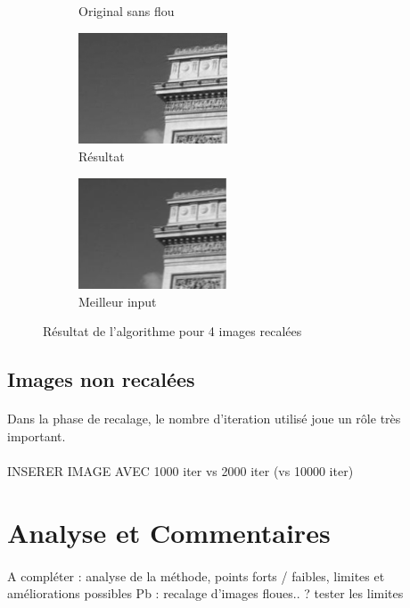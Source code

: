 \documentclass[a4paper,10pt]{report}
\begin{document}
\begin{figure}[h]
\begin{subfigure}{0.32\textwidth}
\caption{Original sans flou}
\label{fig:Original}
\end{subfigure}
\begin{subfigure}{0.32\textwidth}
\includegraphics[width=0.9\linewidth, height=3.3cm]{ressource/detail_result.png}
\caption{Résultat}
\label{fig:Resultat}
\end{subfigure}
\begin{subfigure}{0.32\textwidth}
\includegraphics[width=0.9\linewidth, height=3.3cm]{ressource/detail_flou1.png} 
\caption{Meilleur input}
\label{fig:Bestflou}
\end{subfigure}
\caption{Résultat de l'algorithme pour 4 images recalées}
\label{fig:arctriomphe}
\end{figure}

\subsection{Images non recalées}
\paragraph{}
Dans la phase de recalage, le nombre d'iteration utilisé joue un rôle très important. 
\\\\
INSERER IMAGE AVEC 1000 iter vs 2000 iter (vs 10000 iter)



\section{Analyse et Commentaires}
\paragraph{}
A compléter : analyse de la méthode, points forts / faibles, limites et améliorations possibles
Pb : recalage d'images floues.. ? tester les limites
\end{document}
